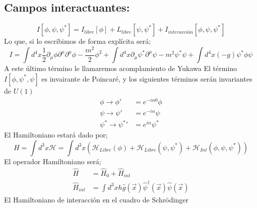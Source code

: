 \documentclass[../main.tex]{subfiles}
\begin{document}
  \subsection{Campos interactuantes:}
  \begin{equation}
    I \left[ \phi , \psi , \psi^* \right] = I_{libre} \left[ \phi \right] + L_{libre} \left[ \psi, \psi^* \right] + I_{interacción} \left[ \phi, \psi , \psi^* \right]
   \end{equation}
   Lo que, si lo escribimos de forma explícita será;
   \begin{equation}
     I = \int d^4x \frac{1}{2} \partial_\mu \phi \partial^\mu \partial^\mu\phi - \frac{m^2}{2} \phi^2 + \int d^4x \partial_\mu \psi^* \partial^\mu \psi - m^2 \psi^*\psi + \int d^4x \left( -g \right) \psi^* \phi \psi
    \end{equation}
    A este último término le llamaremos acomplamiento de Yukawa
El término $I[\phi,\psi^*,\psi]$ es invairante de Poincaré, y los siguientes términos serán invariantes de $U(1)$ 
\begin{align*}
  \phi \longrightarrow \phi'&= e^{-i\alpha 0}\phi \\
  \psi \longrightarrow \psi'&=e^{-i\alpha}\psi \\
  \psi^* \longrightarrow \psi^*'&=e^{i\alpha}\psi^*
\end{align*}
El Hamiltoniano estará dado por;
\begin{equation}
  H = \int d^3x \mathcal{H} = \int d^3x \left( \mathcal{H}_{Libre}(\phi) + \mathcal{H}_{Libre}(\psi,\psi^*) + \mathcal{H}_{Int}(\phi,\psi,\psi^*) \right)
 \end{equation}
 El operador Hamiltoniano será;
 \begin{align*}
   \hat{H} & = \hat{H}_0 + \hat{H}_{int} \\
   \hat{H}_{int} & = \int d^3x h\hat{g}(\vec{x}) \hat{\psi}^\dagger (\vec{x}) \hat{\psi}(\vec{x})
 \end{align*}
 El Hamiltoniano de interacción en el cuadro de Schrödinger
\end{document}
